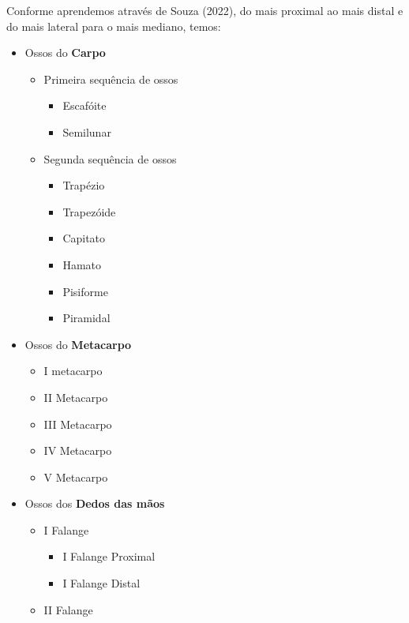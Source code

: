 \documentclass[
]{book}
\providecommand{\tightlist}{%
  \setlength{\itemsep}{0pt}\setlength{\parskip}{0pt}}
\begin{document}
Conforme aprendemos através de Souza (2022), do mais proximal ao mais distal e do mais lateral para o mais mediano, temos:

\begin{itemize}
\tightlist
\item
  Ossos do \textbf{Carpo}

  \begin{itemize}
  \tightlist
  \item
    Primeira sequência de ossos

    \begin{itemize}
    \tightlist
    \item
      Escafóite
    \item
      Semilunar
    \end{itemize}
  \item
    Segunda sequência de ossos

    \begin{itemize}
    \tightlist
    \item
      Trapézio
    \item
      Trapezóide
    \item
      Capitato
    \item
      Hamato
    \item
      Pisiforme
    \item
      Piramidal
    \end{itemize}
  \end{itemize}
\item
  Ossos do \textbf{Metacarpo}

  \begin{itemize}
  \tightlist
  \item
    I metacarpo
  \item
    II Metacarpo
  \item
    III Metacarpo
  \item
    IV Metacarpo
  \item
    V Metacarpo
  \end{itemize}
\item
  Ossos dos \textbf{Dedos das mãos}

  \begin{itemize}
  \tightlist
  \item
    I Falange

    \begin{itemize}
    \tightlist
    \item
      I Falange Proximal
    \item
      I Falange Distal
    \end{itemize}
  \item
    II Falange


\end{itemize}
\end{itemize}
\end{document}
